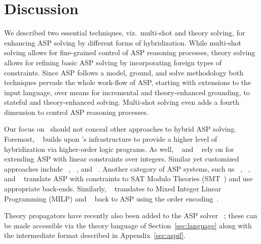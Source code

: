 
\section{Discussion}\label{sec:discussion}

We described two essential techniques, viz.\ multi-shot and theory solving, for enhancing ASP solving
by different forms of hybridization.
While multi-shot solving allows for fine-grained control of ASP reasoning processes,
theory solving allows for refining basic ASP solving by incorporating foreign types of constraints.
%
Since ASP follows a model, ground, and solve methodology both techniques pervade the whole work-flow of ASP,
starting with extensions to the input language, over means for incremental and theory-enhanced grounding,
to stateful and theory-enhanced solving.
Multi-shot solving even adds a fourth dimension to control ASP reasoning processes.

Our focus on \clingo\ should not conceal other approaches to hybrid ASP solving.
Foremost,
\dlvhex~\cite{redl16a} builds upon \clingo's infrastructure to provide a higher level of hybridization via higher-order logic programs.
As well, \clingcon~\cite{bakaossc16a} and \lctocasp~\cite{cakaossc16a} rely on \clingo{} for extending ASP with linear constraints over integers.
Similar yet customized approaches include \adsolver~\cite{megezh08a}, \inca~\cite{drewal10a}, and \ezcsp~\cite{ballie17a}.
Another category of ASP systems,
such us \ezsmt~\cite{liesus16a}, \dingo~\cite{jalini11a}, and \aspmt~\cite{barlee14b}
translate ASP with constraints to SAT Modulo Theories (SMT~\cite{niolti06a}) and use appropriate back-ends.
Similarly, \mingo~\cite{lijani12a} translates to Mixed Integer Linear Programming (MILP)
and \aspartame~\cite{bageinospescsotawe15a} back to ASP using the order encoding~\cite{crabak94a,tatakiba09a}.

Theory propagators have recently also been added to the ASP solver \wasp~\cite{dorisc16a};
these can be made accessible via the theory language of Section~\ref{sec:language} along with the intermediate format described in
Appendix~\ref{sec:aspif}.


